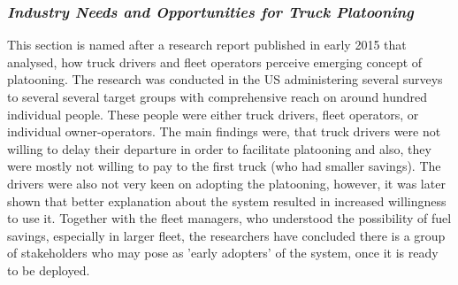 \subsubsection{\textit{Industry Needs and Opportunities for Truck Platooning}}
% 
This section is named after a research report \cite{Shladover2015IndustryPlatooning} published in early 2015 that analysed, how truck drivers and fleet operators perceive emerging concept of platooning. The research was conducted in the US administering several surveys to several several target groups with comprehensive reach on around hundred individual people. These people were either truck drivers, fleet operators, or individual owner-operators\footnotemark. The main findings were, that truck drivers were not willing to delay their departure in order to facilitate platooning and also, they were mostly not willing to pay to the first truck (who had smaller savings). The drivers were also not very keen on adopting the platooning, however, it was later shown that better explanation about the system resulted in increased willingness to use it. Together with the fleet managers, who understood the possibility of fuel savings, especially in larger fleet, the researchers have concluded there is a group of stakeholders who may pose as 'early adopters' of the system, once it is ready to be deployed.
% 
